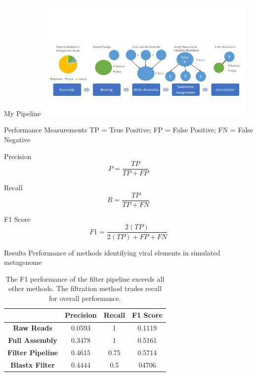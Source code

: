 \documentclass[11pt]{beamer}
\begin{document}
	\begin{frame}{My Pipeline}
	\vspace{-1cm}
	\includegraphics[height=6cm, width=11cm]{figure_2_updated.jpg}
	\end{frame}
	
	
	\begin{frame}{Performance Measurements}
	TP = True Positive; FP = False Positive; FN = False Negative
	\begin{block}{Precision}
	\begin{equation}
	P = \frac{TP} {TP + FP} \nonumber
	\end{equation}
	\end{block}
	\begin{block}{Recall}
	\begin{equation}
	R = \frac{TP}{TP + FN} \nonumber
	\end{equation}
	\end{block}
	\begin{block}{F1 Score}
	\begin{equation}
	F1 = \frac{2(TP)}{2(TP) + FP + FN} \nonumber
	\end{equation}
	\end{block}
	\end{frame}
	
	
	\begin{frame}{Results}
	Performance of methods identifying viral elements in simulated metagenome
	\begin{table}
	\begin{tabular}{|c || c | c | c | }
	\hline
	& \textbf{Precision} & \textbf{Recall} & \textbf{F1 Score} \\
	\hline
	\hline
	\textbf{Raw Reads} & 0.0593 & 1 & 0.1119 \\
	\hline
	\textbf{Full Assembly} & 0.3478 & 1 & 0.5161 \\
	\hline
	\textbf{Filter Pipeline} & \alert{0.4615} & 0.75 & \alert{0.5714} \\
	\hline
	\textbf{Blastx Filter} & 0.4444 & 0.5 & 04706 \\
	\hline
	\end{tabular}
	
	\caption{The F1 performance of the filter pipeline exceeds all other methods. The filtration method trades recall for overall performance.}
	\end{table}
	\end{frame}
	
\end{document}
